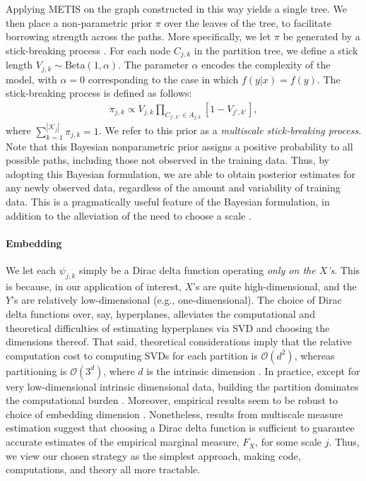 \documentclass{article} %
\providecommand{\mc}[1]{\mathcal{#1}}
\begin{document}
	Applying METIS on the graph constructed in this way yields a single tree.  We then place a non-parametric prior $\pi$ over the leaves of the tree, to facilitate borrowing strength across the paths.  More specifically, we let $\pi$ be generated by a stick-breaking process \cite{stickbreaking}.  For each node $C_{j,k}$ in the partition tree, we define a stick length $V_{j,k} \sim \mbox{Beta}(1,\alpha)$.  The parameter $\alpha$ encodes the complexity of the model, with $\alpha=0$ corresponding to the case in which $f(y|x) = f(y)$. The stick-breaking process is defined as follows: 
	\begin{eqnarray*}
	\pi_{j,k} \propto V_{j,k} \prod_{C_{j',k'} \in A_{j,k}} \left[1 - V_{j',k'} \right],
	\end{eqnarray*}
	where  $\sum_{k=1}^{|\mc{K}_j|} \pi_{j,k} = 1$.   We refer to this prior as a {\em multiscale stick-breaking process}. Note that this Bayesian nonparametric prior assigns a positive probability to all possible paths, including those not observed in the training data.  Thus, by adopting this Bayesian formulation, we are able to obtain posterior estimates for any newly observed data, regardless of the amount and variability of training data.  This is a pragmatically useful feature of the Bayesian formulation, in addition to the alleviation of the need to choose a scale \cite{ChenMaggioni12}.  %


\paragraph{Embedding} We let each $\psi_{j,k}$ simply be a Dirac delta function operating \emph{only on the $X$'s}.  This is because, in our application of interest, $X$'s are quite high-dimensional, and the $Y$'s are relatively low-dimensional (e.g., one-dimensional).  The choice of Dirac delta functions over, say, hyperplanes, alleviates the computational and theoretical difficulties of estimating hyperplanes via SVD and choosing the dimensions thereof. That said,  theoretical considerations imply that the relative computation cost to computing SVDs for each partition is $\mc{O}(d^2)$, whereas partitioning  is  
$\mc{O}(3^d)$, where $d$ is the intrinsic dimension \cite{Allard2012}. In practice, except for very low-dimensional intrinsic dimensional data, building the partition dominates the computational burden \cite{Allard2012}.  Moreover, empirical results seem to be robust to choice of embedding dimension \cite{Lawlor2012}. Nonetheless, results from multiscale measure estimation \cite{ChenMaggioni12} suggest that choosing a Dirac delta function is sufficient to guarantee accurate estimates of the empirical marginal measure, $F_X$, for some scale $j$.  Thus, we view our chosen strategy as the simplest approach, making code, computations, and theory all more tractable.  
\end{document}
